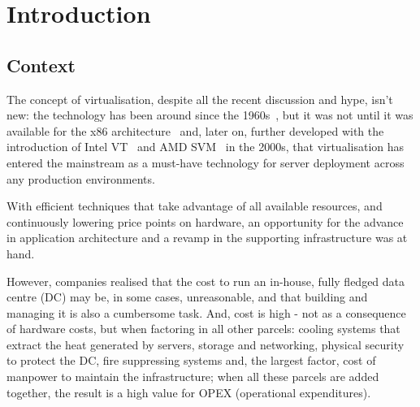 \newcommand{\novathesis}{\emph{novathesis}}
\newcommand{\novathesisclass}{\texttt{novathesis.cls}}


\chapter{Introduction}
\label{cha:introduction}



\section{Context} %
\label{sec:intro_context}

The concept of virtualisation, despite all the recent discussion and hype, isn’t new: the technology has been around since the 1960s~\cite{Buzen1973}, but it was not until it was available for the x86 architecture~\cite{Agesen2010} and, later on, further developed with the introduction of Intel VT~\cite{Intel2010} and AMD SVM~\cite{AMD2010} in the 2000s, that virtualisation has entered the mainstream as a must-have technology for server deployment across any production environments. 

With efficient techniques that take advantage of all available resources, and continuously lowering price points on hardware, an opportunity for the advance in application architecture and a revamp in the supporting infrastructure was at hand.

However, companies realised that the cost to run an in-house, fully fledged data centre (DC) may be, in some cases, unreasonable, and that building and managing it is also a cumbersome task. And, cost is high -  not as a consequence of hardware costs, but when factoring in all other parcels: cooling systems that extract the heat generated by servers, storage and networking, physical security to protect the DC, fire suppressing systems and, the largest factor, cost of manpower to maintain the infrastructure; when all these parcels are added together, the result is a high value for OPEX (operational expenditures).

